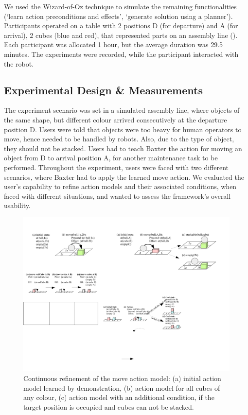 We used the Wizard-of-Oz technique to simulate the remaining functionalities (\eg `learn action preconditions and effects', `generate solution using a planner').
Participants operated on a table with 2 positions D (for departure) and A (for arrival), 2 cubes (blue and red), that represented parts on an assembly line (). 
Each participant was allocated 1 hour, but the average duration was 29.5 minutes. 
The experiments were recorded, while the participant interacted with the robot. 


\subsection{Experimental Design \& Measurements}
The experiment scenario was set in a simulated assembly line, where objects of the same shape, but different colour arrived consecutively at the departure position D.
Users were told that objects were too heavy for human operators to move, hence needed to be handled by robots.
Also, due to the type of object, they should not be stacked.
Users had to teach Baxter the action for moving an object from D to arrival position A, for another maintenance task to be performed.
Throughout the experiment, users were faced with two different scenarios, where Baxter had to apply the learned move action. 
We evaluated the user's capability to refine action models and their associated conditions, when faced with different situations, and wanted to assess the framework's overall usability.

\begin{figure}[h]
	\centering
	\includegraphics[width=0.8\linewidth]{figures/scenarios-exp2}
	\caption{Continuous refinement of the move action model: (a) initial action model learned by demonstration, (b) action model for all cubes of any colour, (c) action model with an additional condition, if the target position is occupied and cubes can not be stacked.}
	\label{fig:scenarios-exp2}
\end{figure} 

